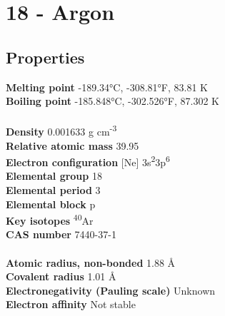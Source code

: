 \section{18 - Argon}
\label{sec:elem-argon}
\subsection{Properties}
\textbf{Melting point} -189.34°C, -308.81°F, 83.81 K\\
\textbf{Boiling point} -185.848°C, -302.526°F, 87.302 K \\
\\
\textbf{Density} 0.001633 g cm\textsuperscript{-3}\\
\textbf{Relative atomic mass} 39.95\\
\textbf{Electron configuration} [Ne] 3s\textsuperscript{2}3p\textsuperscript{6}\\
\textbf{Elemental group} 18\\
\textbf{Elemental period} 3\\
\textbf{Elemental block} p\\
\textbf{Key isotopes} \textsuperscript{40}Ar\\
\textbf{CAS number} 7440-37-1\\
\\
\textbf{Atomic radius, non-bonded} 1.88 Å\\
\textbf{Covalent radius} 1.01 Å\\
\textbf{Electronegativity (Pauling scale)} Unknown\\
\textbf{Electron affinity} Not stable\\